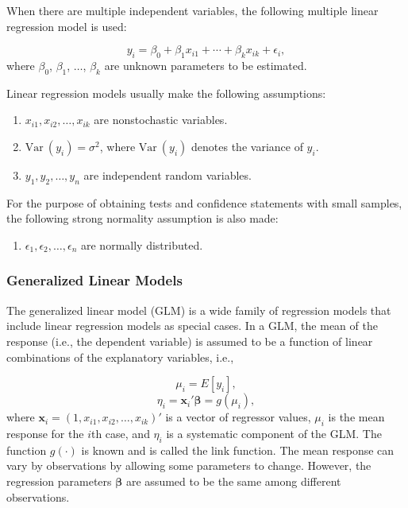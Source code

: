 \documentclass[]{book}
\providecommand{\tightlist}{%
  \setlength{\itemsep}{0pt}\setlength{\parskip}{0pt}}
\theoremstyle{definition}
\theoremstyle{definition}
\theoremstyle{definition}
\theoremstyle{remark}
\begin{document}
When there are multiple independent variables, the following multiple
linear regression model is used:

\[y_i = \beta_0 + \beta_1 x_{i1} + \cdots + \beta_k x_{ik} + \epsilon_i,\]
where \(\beta_0\), \(\beta_1\), \(\ldots\), \(\beta_k\) are unknown
parameters to be estimated.

Linear regression models usually make the following assumptions:

\begin{enumerate}
\def\labelenumi{(\alph{enumi})}
\item
  \(x_{i1},x_{i2},\ldots,x_{ik}\) are nonstochastic variables.
\item
  \(\mathrm{Var~}(y_i)=\sigma^2\), where \(\mathrm{Var~}(y_i)\) denotes
  the variance of \(y_i\).
\item
  \(y_1,y_2,\ldots,y_n\) are independent random variables.
\end{enumerate}

For the purpose of obtaining tests and confidence statements with small
samples, the following strong normality assumption is also made:

\begin{enumerate}
\def\labelenumi{(\alph{enumi})}
\setcounter{enumi}{3}
\tightlist
\item
  \(\epsilon_1,\epsilon_2,\ldots,\epsilon_n\) are normally distributed.
\end{enumerate}

\subsubsection{Generalized Linear
Models}\label{generalized-linear-models}

The generalized linear model (GLM) is a wide family of regression models
that include linear regression models as special cases. In a GLM, the
mean of the response (i.e., the dependent variable) is assumed to be a
function of linear combinations of the explanatory variables, i.e.,

\[\mu_i = E[y_i],\]
\[\eta_i = \textbf{x}_i'\boldsymbol{\beta} = g(\mu_i),\] where
\(\textbf{x}_i=(1,x_{i1}, x_{i2}, \ldots, x_{ik})'\) is a vector of
regressor values, \(\mu_i\) is the mean response for the \(i\)th case,
and \(\eta_i\) is a systematic component of the GLM. The function
\(g(\cdot)\) is known and is called the link function. The mean response
can vary by observations by allowing some parameters to change. However,
the regression parameters \(\boldsymbol{\beta}\) are assumed to be the
same among different observations.
\end{document}
